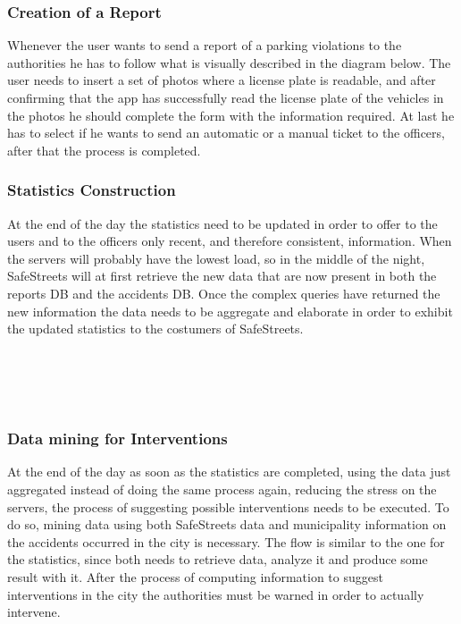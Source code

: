 \subsubsection{Creation of a Report}
Whenever the user wants to send a report of a parking violations to the authorities he has to follow what is visually described in the diagram below.
The user needs to insert a set of photos where a license plate is readable, and after confirming that the app has successfully read the license plate of the vehicles in the photos he should complete the form with the information required. At last he has to select if he wants to send an automatic or a manual ticket to the officers, after that the process is completed.

\clearpage
\subsubsection{Statistics Construction}
At the end of the day the statistics need to be updated in order to offer to the users and to the officers only recent, and therefore consistent, information.
When the servers will probably have the lowest load, so in the middle of the night, SafeStreets will at first retrieve the new data that are now present in both the reports DB and the accidents DB. Once the complex queries have returned the new information the data needs to be aggregate and elaborate in order to exhibit the updated statistics to the costumers of SafeStreets. 
\\
\\
\\
\\
\\
\clearpage
\subsubsection{Data mining for Interventions}
At the end of the day as soon as the statistics are completed, using the data just aggregated instead of doing the same process again, reducing the stress on the servers, the process of suggesting possible interventions needs to be executed. To do so, mining data using both SafeStreets data and municipality information on the accidents occurred in the city is necessary.
The flow is similar to the one for the statistics, since both needs to retrieve data, analyze it and produce some result with it.
After the process of computing information to suggest interventions in the city the authorities must be warned in order to actually intervene.
\\
\\
\\
\\
\\
\clearpage